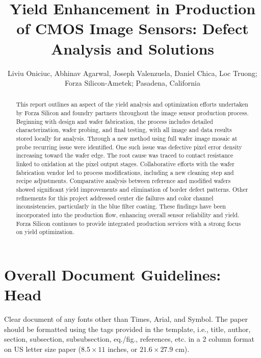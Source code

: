\documentclass[letterpaper,twocolumn,fleqn]{article}
\title{Yield Enhancement in Production of CMOS Image Sensors: Defect Analysis and Solutions }
\author{ Liviu Oniciuc, Abhinav Agarwal, Joseph Valenzuela, Daniel Chica, Loc Truong; Forza Silicon-Ametek; Pasadena, California}
\date{} %
\begin{document}
 

\maketitle 

\thispagestyle{empty} %


\begin{abstract}
This report outlines an aspect of the yield analysis and optimization efforts undertaken by Forza Silicon and foundry partners throughout the image sensor production process. Beginning with design and wafer fabrication, the process includes detailed characterization, wafer probing, and final testing, with all image and data results stored locally for analysis. Through a new method using full wafer image mosaic at probe recurring issue were identified. One such issue was defective pixel error density increasing toward the wafer edge. The root cause was traced to contact resistance linked to oxidation at the pixel output stages. Collaborative efforts with the wafer fabrication vendor led to process modifications, including a new cleaning step and recipe adjustments. Comparative analysis between reference and modified wafers showed significant yield improvements and elimination of border defect patterns. Other refinements for this project addressed center die failures and color channel inconsistencies, particularly in the blue filter coating. These findings have been incorporated into the production flow, enhancing overall sensor reliability and yield. Forza Silicon continues to provide integrated production services with a strong focus on yield optimization.
\end{abstract}


\section{Overall Document Guidelines: Head}
\label{sec:intro}

Clear document of any fonts other than Times, Arial, and Symbol. The
paper should be formatted using the tags provided in the template,
i.e., title, author, section, subsection, subsubsection, eq./fig.,
references, etc.  in a 2 column format on US letter size paper ($8.5
\times 11$ inches, or $21.6 \times 27.9$ cm).
\end{document}
